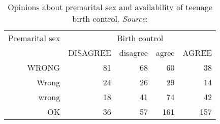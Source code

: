 \begin{table}[ht]
\centering
\caption{Opinions about premarital sex and availability of teenage birth control. 
  \emph{Source}: \citet[Table 10.3]{Agresti:2013}}
\label{tab:birthcontrol}
\begin{tabular}{rrrrr}
  \hline
  Premarital sex & \multicolumn{4}{c}{Birth control} \\
                 & DISAGREE & disagree & agree & AGREE \\ 
  \hline
  WRONG & 81 & 68 & 60 & 38 \\ 
  Wrong & 24 & 26 & 29 & 14 \\ 
  wrong & 18 & 41 & 74 & 42 \\ 
  OK & 36 & 57 & 161 & 157 \\ 
   \hline
\end{tabular}
\end{table} 
